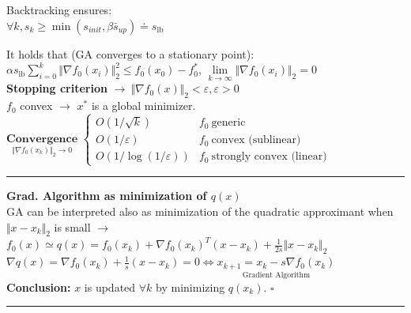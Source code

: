 \documentclass[a4paper]{article}
\begin{document}
\begin{multicols}{2}
\begin{multicols}{2}
        \noindent
        Backtracking ensures:\\
        {\small $\forall{k}, s_k\!\ge\!\min(s_{init}, \beta\bar{s}_{up})\doteq{s_{\text{lb}}}$}
    \end{multicols} 
    \vspace{-0.6cm}
    \noindent
    It holds that (GA converges to a stationary point):\\
    $\alpha{s_{\text{lb}}}\sum_{i=0}^k {\Vert \nabla{f_0}(x_i) \Vert_2^2} \le f_0(x_0)-f_0^*$,  
    $\underset{k\to\infty}{\lim}{\Vert \nabla{f_0}(x_i) \Vert_2}=0$\\
    \textbf{Stopping criterion} $\to \ \Vert \nabla{f_0}(x) \Vert_2 < \varepsilon, \varepsilon>0$\\
    $f_0$ convex $\to$ $x^*$ is a global minimizer.\\
    $\underset{\Vert \nabla{f_0(x_k)} \Vert_2 \to 0}{\textbf{Convergence}}$ $\begin{cases}
        O(1/\sqrt{k})&f_0 \ \text{generic}\\
        O(1/\varepsilon)&f_0 \ \text{convex (sublinear)}\\
        O(1/\log(1/\varepsilon))&f_0 \ \text{strongly convex (linear)}
    \end{cases}$\\
    \hrule\noindent
    \textsf{\textbf{Grad. Algorithm as minimization of $q(x)$}}\\
    GA can be interpreted also as minimization of the quadratic approximant when $\Vert x-x_k \Vert_2$ is small $\to$ $f_0(x)\simeq{q(x)=f_0(x_k) + \nabla{f_0(x_k)}^T(x-x_k)}+\frac{1}{2s}\Vert{x-x_k}\Vert_2$\\
    $\nabla{q(x)}\!=\!\nabla{f_0(x_k)}+\frac{1}{s}(x-x_k)=0 \Leftrightarrow\underset{\text{Gradient Algorithm}}{x_{k+1}=x_k-s\nabla{f_0(x_k)}}$\\
    \textbf{Conclusion:} $x$ is updated $\forall{k}$ by minimizing $q(x_k)$. $\square$
 \end{multicols}
\vspace{-1.1cm}
\noindent
\rule{\textwidth}{1.5pt}
\end{document}
